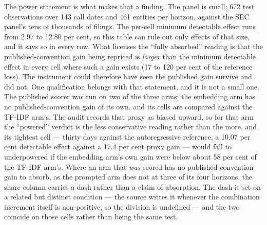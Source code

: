 The power statement is what makes that a finding. The panel is small: 672
test observations over 143 call dates and 461 entities per horizon, against
the SEC panel's tens of thousands of filings. The per-cell minimum
detectable effect runs from 2.97 to 12.80 per cent, so this table can rule
out only effects of that size, and it says so in every row. What licenses
the ``fully absorbed'' reading is that the published-convention gain being
repriced is \emph{larger} than the minimum detectable effect in every cell
where such a gain exists (17 to 120 per cent of the reference loss).
The instrument could therefore have seen the published gain survive and did not.
One qualification belongs with that statement, and it is not a small one. The
published scorer was run on two of the three arms; the embedding arm has no
published-convention gain of its own, and its cells are compared against the
TF-IDF arm's. The audit records that proxy as biased upward, so for that arm
the ``powered'' verdict is the less conservative reading rather than the more,
and its tightest cell --- thirty days against the autoregressive reference, a
10.07 per cent detectable effect against a 17.4 per cent proxy gain --- would
fall to underpowered if the embedding arm's own gain were below about 58 per
cent of the TF-IDF arm's. %
Where an arm that \emph{was} scored has no published-convention gain to absorb,
as the prompted arm does not at three of its four horizons, the share column
carries a dash rather than a claim of absorption. The dash is set on a related
but distinct condition --- the source writes it whenever the combination
increment itself is non-positive, so the division is undefined --- and the two
coincide on those cells rather than being the same test. %

